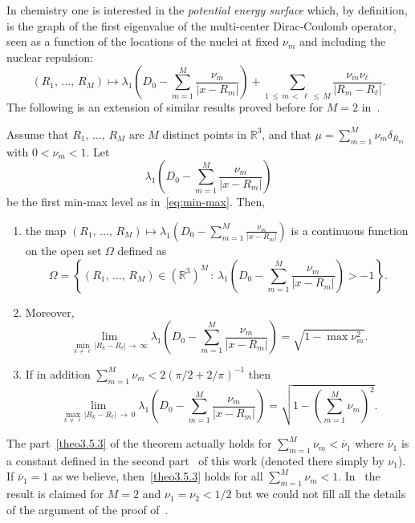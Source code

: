 \documentclass[AHL,Unicode,published]{cedram}
\newcommand{\R}{\mathbb{R}}
\newcommand\1{{\ensuremath {\mathds 1} }}
\newcommand{\ii}{\infty}
\renewcommand{\leq}{\leqslant}
\newcommand*{\romanenumi}{\renewcommand*{\theenumi}{\roman{enumi}}}
\begin{document}
In chemistry one is interested in the \emph{potential energy surface} which, by definition, is the graph of the first eigenvalue of the multi-center Dirac-Coulomb operator, seen as a function of the locations of the nuclei at fixed $\nu_m$ and including the nuclear repulsion:
\[
(R_1,\,\dots,\,R_M)\mapsto \lambda_1\left(D_0-\sum_{m=1}^M\frac{\nu_m}{|x-R_m|}\right)+\sum_{1\,\leq\,m\,<\,\ell\,\leq\,M}\frac{\nu_m\nu_\ell}{|R_m-R_\ell|}.
\]
The following is an extension of similar results proved before for $M=2$ in~\cite{BriHog-03,HarKla-83,Klaus-80b}.


\begin{theo}\label{Thm-continuity}
Assume that $R_1,\,\dots,\,R_M$ are $M$ distinct points in $\R^3$, and that $\mu=\sum_{m=1}^M\nu_m\delta_{R_m}$ with $0< \nu_m< 1$. Let
\[
\lambda_1\left(D_0-\sum_{m=1}^M\frac{\nu_m}{|x-R_m|}\right)
\]
be the first min-max level as in~\eqref{eq:min-max}. Then,
\begin{enumerate}\romanenumi
\item \label{theo3.5.1} the map $(R_1,\,\dots,\,R_M)\mapsto \lambda_1(D_0-\sum_{m=1}^M\frac{\nu_m}{|x-R_m|})$ is a continuous function on the open set $\Omega$ defined as
\[
\Omega=
\left\{(R_1,\,\dots,\,R_M)\in\left(\R^3\right)^M\, :\, \lambda_1\left(D_0-\sum_{m=1}^M\frac{\nu_m}{|x-R_m|}\right)>-1\right\}.
\]


\item \label{theo3.5.2}Moreover,
\begin{equation}
\lim_{\min_{k\,\neq\,\ell}\left|R_k-R_\ell\right|\to\,\ii}\lambda_1\left(D_0-\sum_{m=1}^M\frac{\nu_m}{|x-R_m|}\right)=\sqrt{1-\max\nu_m^2}.
\end{equation}


\item \label{theo3.5.3}If in addition $\sum_{m=1}^M\nu_m< 2(\pi/2+2/\pi)^{-1}$ then
\begin{equation}
\lim_{\max_{k\,\neq\,\ell}\left|R_k-R_\ell\right|\,\to\,0}\lambda_1\left(D_0-\sum_{m=1}^M\frac{\nu_m}{|x-R_m|}\right)=\sqrt{1-\left(\sum_{m=1}^M\nu_m\right)^2}.
\end{equation}
\end{enumerate}
\end{theo}

The part~\eqref{theo3.5.3}  of the theorem actually holds for $\sum_{m=1}^M\nu_m<\overline{\nu}_1$ where $\overline{\nu}_1$ is a constant defined in the second part~\cite{EstLewSer-21b} of this work (denoted there simply by $\nu_1$). If $\overline\nu_1=1$ as we believe, then~\eqref{theo3.5.3} holds for all $\sum_{m=1}^M\nu_m<1$. In~\cite{BriHog-03} the result is claimed for $M=2$ and $\nu_1=\nu_2<1/2$ but we could not fill all the details of the argument of the proof of~\cite[Lemma~3.1]{BriHog-03}.
\end{document}
